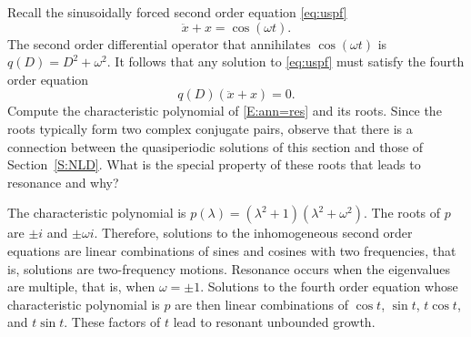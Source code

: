 \documentclass{ximera}
\begin{document}
\begin{exercise}  \label{c12.5.4}
Recall the sinusoidally forced second order equation \eqref{eq:uspf}
\[
\ddot x + x = \cos(\omega t).
\]
The second order differential operator that annihilates $\cos(\omega t)$ is
$q(D)=D^2+\omega^2$.  It follows that any solution to \eqref{eq:uspf} must
satisfy the fourth order equation 
\begin{equation} \label{E:ann=res}
q(D)(\ddot x + x)=0.
\end{equation}
Compute the characteristic polynomial of \eqref{E:ann=res} and its roots. Since
the roots typically form two complex conjugate pairs, observe that there is a
connection between the quasiperiodic solutions of this section and those of
Section~\ref{S:NLD}.  What is the special property of these roots that leads
to resonance and why?

\begin{solution}

The characteristic polynomial is $p(\lambda)=(\lambda^2+1)(\lambda^2+\omega^2)$. 
The roots of $p$ are $\pm i$ and $\pm\omega i$.  Therefore, solutions to the
inhomogeneous second order equations are linear combinations of sines and cosines with
two frequencies, that is, solutions are two-frequency motions.  Resonance occurs
when the eigenvalues are multiple, that is, when $\omega=\pm 1$.  Solutions to the
fourth order equation whose characteristic polynomial is $p$ are then linear
combinations of $\cos t$, $\sin t$, $t\cos t$, and $t\sin t$.  These factors of $t$ 
lead to resonant unbounded growth.


\end{solution}
\end{exercise}
\end{document}
